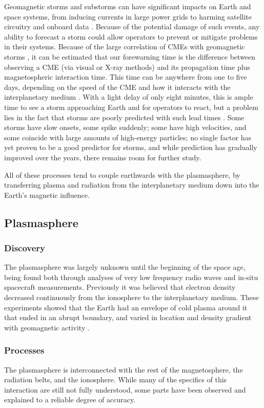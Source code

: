 Geomagnetic storms and substorms can have significant impacts on Earth and space systems, from inducing currents in large power grids to harming satellite circuitry and onboard data \cite{1989Storm}. Because of the potential damage of such events, any ability to forecast a storm could allow operators to prevent or mitigate problems in their systems. Because of the large correlation of CMEs with geomagnetic storms \cite{Yermolaev}, it can be estimated that our forewarning time is the difference between observing a CME (via visual or X-ray methods) and its propagation time plus magnetospheric interaction time. This time can be anywhere from one to five days, depending on the speed of the CME and how it interacts with the interplanetary medium \cite{StormSources}. With a light delay of only eight minutes, this is ample time to see a storm approaching Earth and for operators to react, but a problem lies in the fact that storms are poorly predicted with such lead times \cite{WeigelDecision}. Some storms have slow onsets, some spike suddenly; some have high velocities, and some coincide with large amounts of high-energy particles; no single factor has yet proven to be a good predictor for storms, and while prediction has gradually improved over the years, there remains room for further study. 

All of these processes tend to couple earthwards with the plasmasphere, by transferring plasma and radiation from the interplanetary medium down into the Earth's magnetic influence. 

\subsection{Plasmasphere}

\subsubsection{Discovery}
The plasmasphere was largely unknown until the beginning of the space age, being found both through analyses of very low frequency radio waves and in-situ spacecraft measurements. Previously it was believed that electron density decreased continuously from the ionosphere to the interplanetary medium. These experiments showed that the Earth had an envelope of cold plasma around it that ended in an abrupt boundary, and varied in location and density gradient with geomagnetic activity \cite{EarthsPlasmasphere}.

\subsubsection{Processes}
The plasmasphere is interconnected with the rest of the magnetosphere, the radiation belts, and the ionosphere. While many of the specifics of this interaction are still not fully understood, some parts have been observed and explained to a reliable degree of accuracy. 

